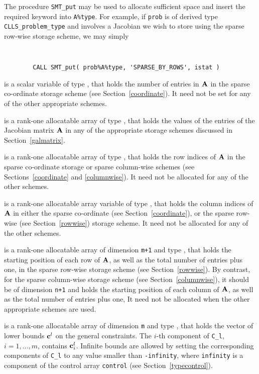 \documentclass{galahad}
\newcommand{\packagename}{CLLS}
\begin{document}
\begin{description}
\begin{description}
The procedure {\tt SMT\_put} may be used to allocate sufficient space and
insert the required keyword into {\tt A\%type}. For example,
if {\tt prob} is of derived type {\tt \packagename\_problem\_type}
and involves a Jacobian we wish to store using the sparse row-wise
storage scheme, we may simply
{\tt
\begin{verbatim}
        CALL SMT_put( prob%A%type, 'SPARSE_BY_ROWS', istat )
\end{verbatim}
}
\noindent

 is a scalar variable of type \integer, that
holds the number of entries in ${\mathbf{A}}$
in the sparse co-ordinate storage scheme (see Section~\ref{coordinate}).
It need not be set for any of the other appropriate schemes.

 is a rank-one allocatable array of type \realdp, that holds
the values of the entries of the Jacobian matrix ${\mathbf{A}}$ in any of the
appropriate storage schemes discussed in Section~\ref{galmatrix}.

 is a rank-one allocatable array of type \integer,
that holds the row indices of ${\mathbf{A}}$ in the sparse co-ordinate storage
or sparse column-wise schemes
(see Sections~\ref{coordinate} and \ref{columnwise}).
It need not be allocated for any of the other schemes.

 is a rank-one allocatable array variable of type \integer,
that holds the column indices of ${\mathbf{A}}$ in either the sparse co-ordinate
(see Section~\ref{coordinate}), or the sparse row-wise
(see Section~\ref{rowwise}) storage scheme.
It need not be allocated for any of the other schemes.

 is a rank-one allocatable array of dimension {\tt m+1} and type
\integer, that holds the starting position of each row of ${\mathbf{A}}$,
as well as the total number of entries plus one,
in the sparse row-wise storage scheme (see Section~\ref{rowwise}).
By contrast, for the sparse column-wise storage scheme
(see Section~\ref{columnwise}), it should be of dimension {\tt n+1}
and holds the starting position of each column of ${\mathbf{A}}$,
as well as the total number of entries plus one,
It need not be allocated when the other appropriate schemes are used.

\end{description}

 is a rank-one allocatable array of dimension {\tt m} and type
\realdp, that holds the vector of lower bounds ${\mathbf{c}}^{l}$
on the general constraints. The $i$-th component of
{\tt C\_l}, $i = 1, \ldots , m$, contains ${\mathbf{c}}_{i}^{l}$.
Infinite bounds are allowed by setting the corresponding
components of {\tt C\_l} to any value smaller than {\tt -infinity},
where {\tt infinity} is a component of the control array {\tt control}
(see Section~\ref{typecontrol}).


\end{description}
\end{document}
